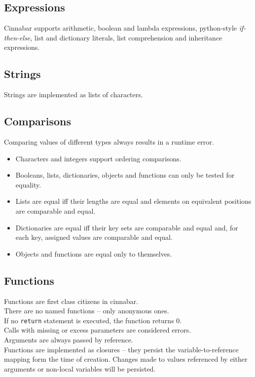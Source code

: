 \documentclass[a4paper,11pt]{article}
\begin{document}
\subsection*{Expressions}

Cinnabar supports arithmetic, boolean and lambda expressions, python-style \emph{if-then-else}, list and dictionary literals, list comprehension and inheritance expressions.

\subsection*{Strings}

Strings are implemented as lists of characters.

\subsection*{Comparisons}

Comparing values of different types always results in a runtime error.
\begin{itemize}
\item Characters and integers support ordering comparisons.
\item Booleans, lists, dictionaries, objects and functions can only be tested for equality.
\item Lists are equal iff their lengths are equal and elements on equivalent positions are comparable and equal.
\item Dictionaries are equal iff their key sets are comparable and equal and, for each key, assigned values are comparable and equal.
\item Objects and functions are equal only to themselves.
\end{itemize}

\subsection*{Functions}

Functions are first class citizens in cinnabar.\\
There are no named functions -- only anonymous ones. \\
If no {\tt return} statement is executed, the function returns $0$.\\
Calls with missing or excess parameters are considered errors.\\
Arguments are always passed by reference.\\
Functions are implemented as closures -- they persist the variable-to-reference mapping form the time of creation. Changes made to values referenced by either arguments or non-local variables will be persisted.
\end{document}
